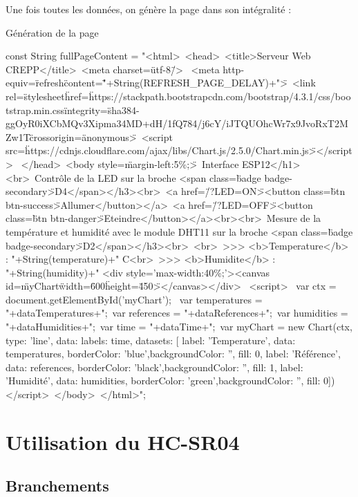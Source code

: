 Une fois toutes les données, on génère la page dans son intégralité :


\begin{Cpp}{Génération de la page}

const String fullPageContent = "<html>\
<head>\
  <title>Serveur Web CREPP</title>\
  <meta charset=\"utf-8\"/> \
  <meta http-equiv=\"refresh\" content=\""+String(REFRESH_PAGE_DELAY)+"\">\
  <link rel=\"stylesheet\" href=\"https://stackpath.bootstrapcdn.com/bootstrap/4.3.1/css/bootstrap.min.css\" integrity=\"sha384-ggOyR0iXCbMQv3Xipma34MD+dH/1fQ784/j6cY/iJTQUOhcWr7x9JvoRxT2MZw1T\" crossorigin=\"anonymous\">\
  <script src=\"https://cdnjs.cloudflare.com/ajax/libs/Chart.js/2.5.0/Chart.min.js\"></script>  \
  </head>\
<body style=\"margin-left:5\%;\">\
  <h1>Interface ESP12</h1><br>\
  <h3>Contrôle de la LED sur la broche <span class=\"badge badge-secondary\">D4</span></h3><br>\
    <a href=\"/?LED=ON\"><button class=\"btn btn-success\">Allumer</button></a>\
    <a href=\"/?LED=OFF\"><button class=\"btn btn-danger\">Eteindre</button></a><br><br>\
  <h3>Mesure de la température et humidité avec le module DHT11 sur la broche <span class=\"badge badge-secondary\">D2</span></h3><br>\
    <br>\
    >>> <b>Temperature</b> : "+String(temperature)+" C<br>\
    >>> <b>Humidite</b> : "+String(humidity)+"%
    <div style='max-width:40\%;'><canvas id=\"myChart\" width=\"600\" height=\"450\"></canvas></div> \
      <script> \
var ctx = document.getElementById('myChart'); \
var temperatures = "+dataTemperatures+";\
var references = "+dataReferences+";\
var humidities = "+dataHumidities+";\
var time = "+dataTime+";\
var myChart = new Chart(ctx, {type: 'line', data: { labels: time, datasets: [{ label: 'Temperature', data: temperatures, borderColor: 'blue',backgroundColor: '', fill: 0}, { label: 'Référence', data: references, borderColor: 'black',backgroundColor: '', fill: 1}, { label: 'Humidité', data: humidities, borderColor: 'green',backgroundColor: '', fill: 0}]}})</script>\
</body>\
</html>";

\end{Cpp}


\section{Utilisation du HC-SR04}

\subsection{Branchements}

